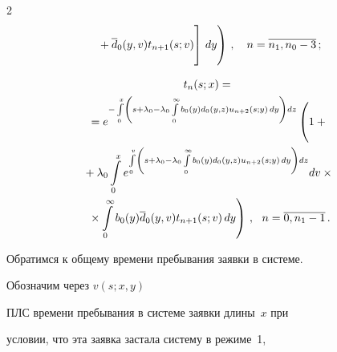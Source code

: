 \begin{multicols}{2}
\begin{multline}
\left.\left.{}+ \d_0(y,v) t_{n+1}(s;v)


\vphantom{\int\limits_0^\infty}


\right] \, dy


\right) \,, \quad 


n=\overline{n_1,n_0-3}\,;


\end{multline}







\vspace*{-12pt}





\noindent


\begin{multline*}


t_n(s;x) = {}\\


{}=e^{-\int\limits_0^x\left( \vphantom{\int\limits_0^\infty}


s + \lambda_0 - \lambda_0 \int\limits_0^\infty b_0(y) d_0(y,z) u_{n+2}(s;y) \, dy \right)


dz} \left(  \vphantom{\int\limits_0^x}


1 +{}\right.\\


{}+ \lambda_0 \int\limits_0^x e^{\int\limits_0^v\left(


s + \lambda_0 -\lambda_0 \int\limits_0^\infty b_0(y) d_0(y,z) u_{n+2}(s;y) \, dy


\right) dz } dv \times{}\\


\left.{}\times


\int\limits_0^\infty b_0(y) \d_0(y,v) t_{n+1}(s;v) \, dy


\right)\,,


\ \ n=\overline{0,n_1-1}\,.


\end{multline*}





Обратимся к общему времени пребывания заявки в системе.





Обозначим через $v(s;x,y)$


ПЛС времени пребывания в системе заявки длины~$x$ при


условии, что эта заявка застала систему в режиме~1,



\end{multicols}
